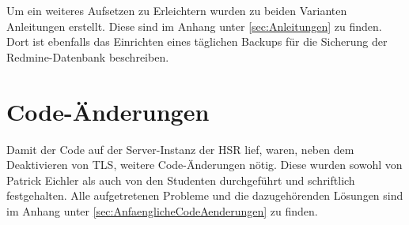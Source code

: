 Um ein weiteres Aufsetzen zu Erleichtern wurden zu beiden Varianten Anleitungen erstellt. Diese sind im Anhang unter \ref{sec:Anleitungen} zu finden.
Dort ist ebenfalls das Einrichten eines täglichen Backups für die Sicherung der Redmine-Datenbank beschreiben.


\section{Code-Änderungen}
Damit der Code auf der Server-Instanz der HSR lief, waren, neben dem Deaktivieren von TLS, weitere Code-Änderungen nötig. Diese wurden sowohl von Patrick Eichler als auch von den Studenten durchgeführt und schriftlich festgehalten. Alle aufgetretenen Probleme und die dazugehörenden Lösungen sind im Anhang unter \ref{sec:AnfaenglicheCodeAenderungen} zu finden.
